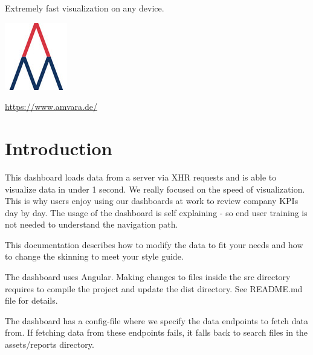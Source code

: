 \documentclass[11pt]{article}
\begin{document}
 
\maketitle %
\thispagestyle{empty}

\begin{centering} %
	Extremely fast visualization on any device.
	\bigskip
	\par
	\bigskip
	\bigskip
	\bigskip
	\bigskip
	\bigskip
	\bigskip
	\bigskip
	\bigskip
	\bigskip
	\bigskip	
	\bigskip
	\bigskip
	\bigskip
	\bigskip
	\bigskip
	\bigskip
	\bigskip
	\bigskip
	\bigskip
	\bigskip
	\bigskip
	\bigskip
	\includegraphics{amvara} \par
	\bigskip
	\url{https://www.amvara.de/} \par
	\bigskip
	\bigskip
	\date{\today}\par %
\end{centering}

\newpage %
\tableofcontents %
\thispagestyle{empty}
\newpage



\section{Introduction} %
This dashboard loads data from a server via XHR requests and is able to visualize data in under 1 second. We really focused on the speed of visualization. This is why users enjoy using our dashboards at work to review company KPIs day by day. The usage of the dashboard is self explaining - so end user training is not needed to understand the navigation path. 
\bigskip

This documentation describes how to modify the data to fit your needs and how to change the skinning to meet your style guide.
\bigskip

The dashboard uses Angular. Making changes to files inside the src directory requires to compile the project and update the dist directory. See README.md file for details.
\bigskip

The dashboard has a config-file where we specify the data endpoints to fetch data from. If fetching data from these endpoints fails, it falls back to search files in the assets/reports directory. 
\bigskip
\end{document}
